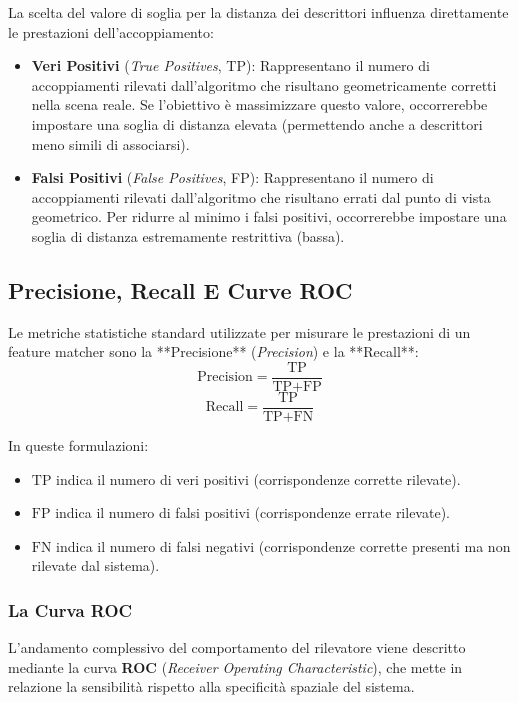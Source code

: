 ﻿\documentclass[11pt, a4paper]{article}
\begin{document}
La scelta del valore di soglia per la distanza dei descrittori influenza direttamente le prestazioni dell'accoppiamento:


\begin{itemize}
    \item \textbf{Veri Positivi} (\emph{True Positives}, TP): Rappresentano il numero di accoppiamenti rilevati dall'algoritmo che risultano geometricamente corretti nella scena reale. Se l'obiettivo è massimizzare questo valore, occorrerebbe impostare una soglia di distanza elevata (permettendo anche a descrittori meno simili di associarsi).
    \item \textbf{Falsi Positivi} (\emph{False Positives}, FP): Rappresentano il numero di accoppiamenti rilevati dall'algoritmo che risultano errati dal punto di vista geometrico. Per ridurre al minimo i falsi positivi, occorrerebbe impostare una soglia di distanza estremamente restrittiva (bassa).
\end{itemize}

\subsection{Precisione, Recall E Curve ROC}

Le metriche statistiche standard utilizzate per misurare le prestazioni di un feature matcher sono la **Precisione** (\emph{Precision}) e la **Recall**:
\[ \boxed{\text{Precision} = \frac{\text{TP}}{\text{TP} + \text{FP}}} \]
\[ \boxed{\text{Recall} = \frac{\text{TP}}{\text{TP} + \text{FN}}} \]

In queste formulazioni:
\begin{itemize}
    \item $\text{TP}$ indica il numero di veri positivi (corrispondenze corrette rilevate).
    \item $\text{FP}$ indica il numero di falsi positivi (corrispondenze errate rilevate).
    \item $\text{FN}$ indica il numero di falsi negativi (corrispondenze corrette presenti ma non rilevate dal sistema).
\end{itemize}

\subsubsection{La Curva ROC}
L'andamento complessivo del comportamento del rilevatore viene descritto mediante la curva \textbf{ROC} (\emph{Receiver Operating Characteristic}), che mette in relazione la sensibilità rispetto alla specificità spaziale del sistema.
\end{document}

